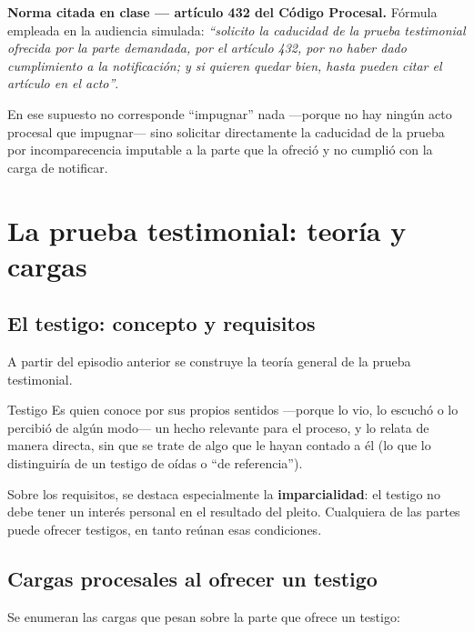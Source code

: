 \documentclass[12pt,oneside]{book}
\begin{document}
\begin{important}
\textbf{Norma citada en clase --- artículo 432 del Código Procesal.} Fórmula empleada en la audiencia simulada: \textit{``solicito la caducidad de la prueba testimonial ofrecida por la parte demandada, por el artículo 432, por no haber dado cumplimiento a la notificación; y si quieren quedar bien, hasta pueden citar el artículo en el acto''}.

En ese supuesto no corresponde ``impugnar'' nada ---porque no hay ningún acto procesal que impugnar--- sino solicitar directamente la caducidad de la prueba por incomparecencia imputable a la parte que la ofreció y no cumplió con la carga de notificar.
\end{important}

\chapter{La prueba testimonial: teoría y cargas}

\section{El testigo: concepto y requisitos}

A partir del episodio anterior se construye la teoría general de la prueba testimonial.

\begin{definition}{Testigo}
Es quien conoce por sus propios sentidos ---porque lo vio, lo escuchó o lo percibió de algún modo--- un hecho relevante para el proceso, y lo relata de manera directa, sin que se trate de algo que le hayan contado a él (lo que lo distinguiría de un testigo de oídas o ``de referencia'').
\end{definition}

Sobre los requisitos, se destaca especialmente la \textbf{imparcialidad}: el testigo no debe tener un interés personal en el resultado del pleito. Cualquiera de las partes puede ofrecer testigos, en tanto reúnan esas condiciones.

\section{Cargas procesales al ofrecer un testigo}

Se enumeran las cargas que pesan sobre la parte que ofrece un testigo:
\end{document}
